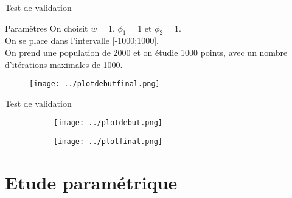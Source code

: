 \documentclass{beamer}
\begin{document}
  \begin{frame}{Test de validation}
    \begin{block}{Paramètres}
      On choisit $w=1$, $\phi_1 = 1$ et $\phi_2 = 1$. \\
      On se place dans l'intervalle [-1000;1000]. \\
      On prend une population de 2000 et on étudie 1000 points, avec un nombre d'itérations maximales de 1000.
    \end{block}\pause
    \begin{figure}
      \begin{center}
        \texttt{[image: ../plotdebutfinal.png]} 
      \end{center}
    \end{figure}
  \end{frame}

  \begin{frame}{Test de validation}
    \begin{figure}
      \begin{subfigure}[b]{0.49\textwidth}
        \texttt{[image: ../plotdebut.png]} 
      \end{subfigure}
      \begin{subfigure}[b]{0.49\textwidth}
        \texttt{[image: ../plotfinal.png]} 
      \end{subfigure}
    \end{figure}
  \end{frame}

\section{Etude paramétrique}
\end{document}
